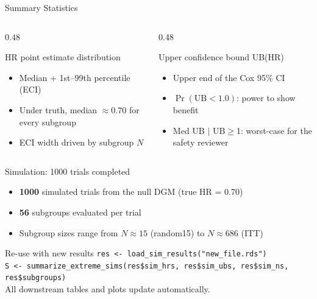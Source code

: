 \documentclass[
  11pt,
  ignorenonframetext,
  aspectratio=169,
]{beamer}
\providecommand{\tightlist}{%
  \setlength{\itemsep}{0pt}\setlength{\parskip}{0pt}}
\begin{document}
\begin{frame}{Summary Statistics}
\label{summary-statistics}
\begin{columns}[T]
\begin{column}{0.48\linewidth}
\begin{block}{HR point estimate distribution}
\begin{itemize}\small
\item Median + 1st--99th percentile (ECI)
\item Under truth, median $\approx 0.70$ for every subgroup
\item ECI width driven by subgroup $N$
\end{itemize}
\end{block}
\end{column}

\begin{column}{0.48\linewidth}
\begin{block}{Upper confidence bound UB(HR)}
\begin{itemize}\small
\item Upper end of the Cox 95\% CI
\item $\Pr(\text{UB} < 1.0)$: power to show benefit
\item Med UB $|$ UB$\ge$1: worst-case for the safety reviewer
\end{itemize}
\end{block}
\end{column}
\end{columns}
\end{frame}

\begin{frame}{Simulation: 1000 trials completed}
\label{simulation-1000-trials-completed}
\begin{itemize}
\tightlist
\item
  \textbf{1000} simulated trials from the null DGM (true HR = 0.70)
\item
  \textbf{56} subgroups evaluated per trial
\item
  Subgroup sizes range from \(N \approx 15\) (random15) to
  \(N \approx 686\) (ITT)
\end{itemize}

\begin{alertblock}{Re-use with new results}
\footnotesize
\texttt{res <- load\_sim\_results("new\_file.rds")}\\
\texttt{S <- summarize\_extreme\_sims(res\$sim\_hrs, res\$sim\_ubs, res\$sim\_ns, res\$subgroups)}\\
All downstream tables and plots update automatically.
\end{alertblock}
\end{frame}
\end{document}
